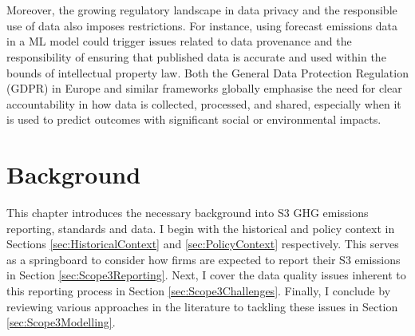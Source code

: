 \documentclass[12pt,twoside]{report}
\begin{document}
\\\\
Moreover, the growing regulatory landscape in data privacy and the responsible use of data also imposes restrictions. For instance, using forecast emissions data in a ML model could trigger issues related to data provenance and the responsibility of ensuring that published data is accurate and used within the bounds of intellectual property law. Both the General Data Protection Regulation (GDPR) in Europe and similar frameworks globally emphasise the need for clear accountability in how data is collected, processed, and shared, especially when it is used to predict outcomes with significant social or environmental impacts. 
\chapter{Background} \label{Chapter:Background}

This chapter introduces the necessary background into S3 GHG emissions reporting, standards and data. I begin with the historical and policy context in Sections \ref{sec:HistoricalContext} and \ref{sec:PolicyContext} respectively. This serves as a springboard to consider how firms are expected to report their S3 emissions in Section \ref{sec:Scope3Reporting}. Next, I cover the data quality issues inherent to this reporting process in Section \ref{sec:Scope3Challenges}. Finally, I conclude by reviewing various approaches in the literature to tackling these issues in Section \ref{sec:Scope3Modelling}. 
\end{document}
